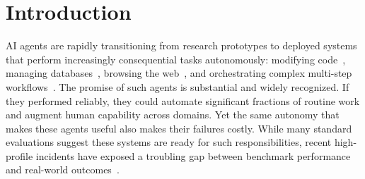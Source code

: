 \documentclass[11pt]{article}
\begin{document}
\section{Introduction}
\label{sec:intro}

AI agents are rapidly transitioning from research prototypes to deployed systems that perform increasingly consequential tasks autonomously: modifying code~\citep{yang2024swe}, managing databases~\citep{wang2025mac}, browsing the web~\citep{deng2023mind2web}, and orchestrating complex multi-step workflows~\citep{yao2022react}.
The promise of such agents is substantial and widely recognized. If they performed reliably, they could automate significant fractions of routine work and augment human capability across domains.
Yet the same autonomy that makes these agents useful also makes their failures costly. While many standard evaluations suggest these systems are ready for such responsibilities, recent high-profile incidents have exposed a troubling gap between benchmark performance and real-world outcomes~\citep{pan2025measuring}.
\end{document}
